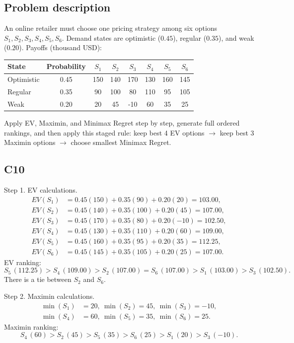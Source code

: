 \begin{ExamProblems}
		\newpage
		\item
		\subsection*{Problem description}
		An online retailer must choose one pricing strategy among six options $S_1,S_2,S_3,S_4,S_5,S_6$.
		Demand states are optimistic ($0.45$), regular ($0.35$), and weak ($0.20$).
		Payoffs (thousand USD):
		\begin{center}
			\begin{tabular}{l c c c c c c c}
				\toprule
				State & Probability & $S_1$ & $S_2$ & $S_3$ & $S_4$ & $S_5$ & $S_6$ \\
				\midrule
				Optimistic & 0.45 & 150 & 140 & 170 & 130 & 160 & 145 \\
				Regular & 0.35 & 90 & 100 & 80 & 110 & 95 & 105 \\
				Weak & 0.20 & 20 & 45 & -10 & 60 & 35 & 25 \\
				\bottomrule
			\end{tabular}
		\end{center}
		Apply EV, Maximin, and Minimax Regret step by step, generate full ordered rankings, and then apply this staged rule:
		keep best 4 EV options $\rightarrow$ keep best 3 Maximin options $\rightarrow$ choose smallest Minimax Regret.

		\subsection*{C10}
		Step 1. EV calculations.
		\[
		\begin{aligned}
		EV(S_1)&=0.45(150)+0.35(90)+0.20(20)=103.00,\\
		EV(S_2)&=0.45(140)+0.35(100)+0.20(45)=107.00,\\
		EV(S_3)&=0.45(170)+0.35(80)+0.20(-10)=102.50,\\
		EV(S_4)&=0.45(130)+0.35(110)+0.20(60)=109.00,\\
		EV(S_5)&=0.45(160)+0.35(95)+0.20(35)=112.25,\\
		EV(S_6)&=0.45(145)+0.35(105)+0.20(25)=107.00.
		\end{aligned}
		\]
		EV ranking:
		\[
		S_5\,(112.25)>S_4\,(109.00)>S_2\,(107.00)=S_6\,(107.00)>S_1\,(103.00)>S_3\,(102.50).
		\]
		There is a tie between $S_2$ and $S_6$.

		Step 2. Maximin calculations.
		\[
		\begin{aligned}
		\min(S_1)&=20,\ \min(S_2)=45,\ \min(S_3)=-10,\\
		\min(S_4)&=60,\ \min(S_5)=35,\ \min(S_6)=25.
		\end{aligned}
		\]
		Maximin ranking:
		\[
		S_4\,(60)>S_2\,(45)>S_5\,(35)>S_6\,(25)>S_1\,(20)>S_3\,(-10).
		\]


\end{ExamProblems}
